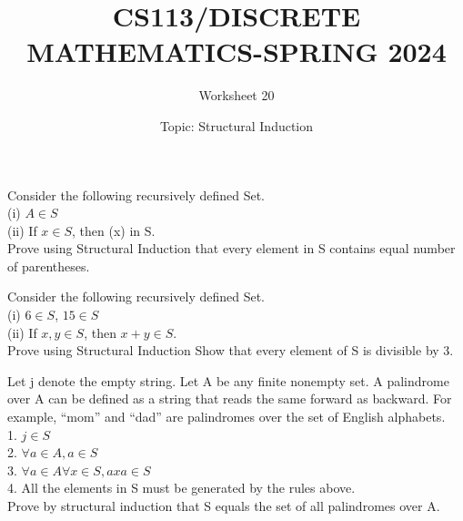 \documentclass{exam}
\title{CS113/DISCRETE MATHEMATICS-SPRING 2024}
\author{Worksheet 20}
\date{Topic: Structural Induction}
\begin{document}
\maketitle

\begin{center}
\end{center}

\vspace{5mm}

\vspace{5mm}

\vspace{5mm}
\begin{questions}

\question
Consider the following recursively defined Set.\\
(i) $A \in S$ \\
(ii) If $x \in S$, then (x) in S.\\
Prove using Structural Induction that every element in S contains equal number of parentheses.
\vspace{9in}


\question 

Consider the following recursively defined Set.\\
(i) $6 \in S$, $15 \in S$ \\
(ii) If $x,y \in S$, then $x+y \in S$.\\
Prove using Structural Induction Show that every element of S is divisible by 3.
\vspace{9in}

\question Let j denote the empty string. Let A be any finite nonempty
set. A palindrome over A can be defined as a string that reads the same
forward as backward. For example, “mom” and “dad” are palindromes
over the set of English alphabets.\\
1. $j \in S$\\
2. $ \forall a \in A, a \in S$\\
3. $ \forall a \in A \forall x \in S, axa \in S$\\
4. All the elements in S must be generated by the rules above.\\
Prove by structural induction that S equals the set of all palindromes
over A.
\vspace{9in}


\end{questions}
\end{document}
